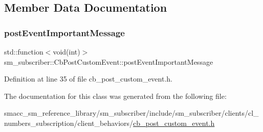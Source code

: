 \subsection{Member Data Documentation}
\mbox{\label{classsm__subscriber_1_1CbPostCustomEvent_a671b613e1b9223a0d1cbe06782e28a06}} 
\subsubsection{\texorpdfstring{post\+Event\+Important\+Message}{postEventImportantMessage}}
{\footnotesize\ttfamily std\+::function$<$void(int)$>$ sm\+\_\+subscriber\+::\+Cb\+Post\+Custom\+Event\+::post\+Event\+Important\+Message}



Definition at line 35 of file cb\+\_\+post\+\_\+custom\+\_\+event.\+h.



The documentation for this class was generated from the following file\+:\begin{DoxyCompactItemize}
\item 
smacc\+\_\+sm\+\_\+reference\+\_\+library/sm\+\_\+subscriber/include/sm\+\_\+subscriber/clients/cl\+\_\+numbers\+\_\+subscription/client\+\_\+behaviors/\hyperlink{cb__post__custom__event_8h}{cb\+\_\+post\+\_\+custom\+\_\+event.\+h}\end{DoxyCompactItemize}
